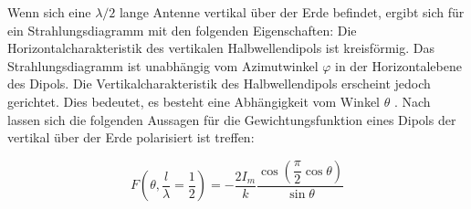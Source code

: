 Wenn sich eine $\lambda /2$ lange Antenne vertikal über der Erde befindet, ergibt sich für ein Strahlungsdiagramm mit den folgenden Eigenschaften: 
Die Horizontalcharakteristik des vertikalen Halbwellendipols ist kreisförmig. Das Strahlungsdiagramm ist unabhängig vom Azimutwinkel $\varphi$ in der Horizontalebene des Dipols. Die Vertikalcharakteristik des Halbwellendipols erscheint jedoch gerichtet. Dies bedeutet, es besteht eine Abhängigkeit vom Winkel $\theta$ \cite{zinke1965lehrbuch}. 
Nach \cite{elliott1981antenna} lassen sich die folgenden Aussagen für die Gewichtungsfunktion eines Dipols der vertikal über der Erde polarisiert ist treffen\cite{elliott1981antenna}:

\begin{equation}\label{eq:FDipolTheat}
F(\theta,\frac{l}{\lambda}=\dfrac{1}{2})=-\dfrac{2I_{m}}{k}\dfrac{\cos\left(\dfrac{\pi}{2}\cos\theta\right)}{\sin\theta}
\end{equation}


